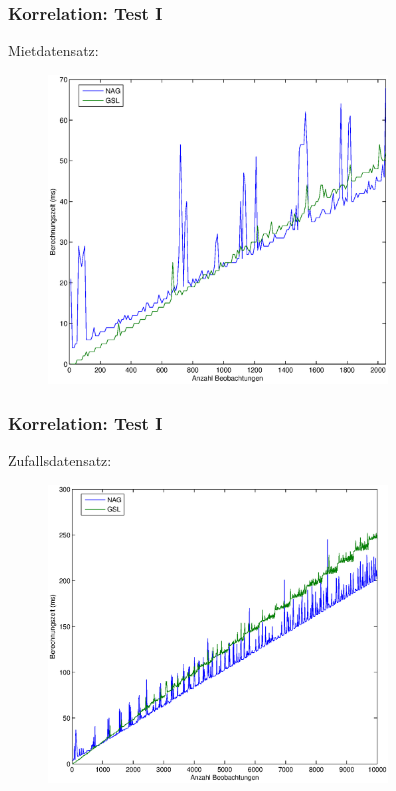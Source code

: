 \documentclass{beamer}
\begin{document}
\begin{frame}
	\frametitle{Korrelation: Test I}
	
	Mietdatensatz:
	
	\begin{figure}[t]
    \centering
    \includegraphics[width=9cm]{figures/test_corr_1_rent.eps}
  \end{figure}
\end{frame}

\begin{frame}
	\frametitle{Korrelation: Test I}
	
	Zufallsdatensatz:
	
	\begin{figure}[t]
    \centering
    \includegraphics[width=9cm]{figures/test_corr_1_random.eps}
  \end{figure}
\end{frame}
\end{document}
